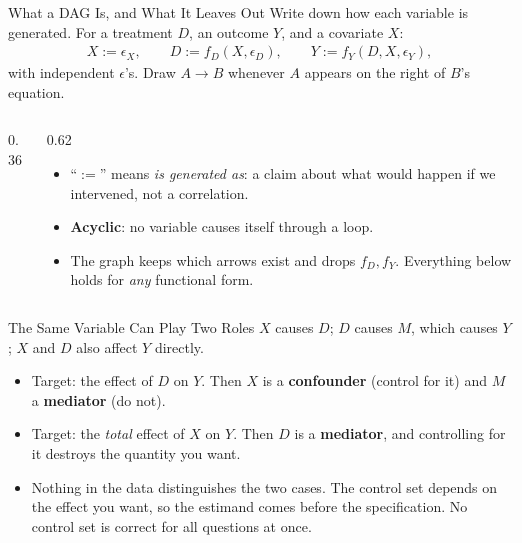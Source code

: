 \documentclass[aspectratio=169,11pt,xcolor=dvipsnames]{beamer}
\begin{document}
\begin{frame}{What a DAG Is, and What It Leaves Out}
Write down how each variable is generated. For a treatment $D$, an outcome
$Y$, and a covariate $X$:
\begin{align*}
  X := \epsilon_X, \qquad
  D := f_D(X, \epsilon_D), \qquad
  Y := f_Y(D, X, \epsilon_Y) ,
\end{align*}
with independent $\epsilon$'s. Draw $A \to B$ whenever $A$ appears on the
right of $B$'s equation.
\begin{columns}[c]
\begin{column}{0.36\textwidth}
\centering
{}
\end{column}
\begin{column}{0.62\textwidth}
\begin{itemize}\itemsep3pt
  \item ``$:=$'' means \emph{is generated as}: a claim about what would
        happen if we intervened, not a correlation.
  \item \textbf{Acyclic}: no variable causes itself through a loop.
  \item The graph keeps which arrows exist and drops $f_D, f_Y$. Everything
        below holds for \emph{any} functional form.
\end{itemize}
\end{column}
\end{columns}
\end{frame}

\begin{frame}{The Same Variable Can Play Two Roles}
$X$ causes $D$; $D$ causes $M$, which causes $Y$; $X$ and $D$ also affect $Y$
directly.
\begin{center}
\end{center}
\begin{itemize}\itemsep3pt
  \item Target: the effect of $D$ on $Y$. Then $X$ is a \textbf{confounder}
        (control for it) and $M$ a \textbf{mediator} (do not).
  \item Target: the \emph{total} effect of $X$ on $Y$. Then $D$ is a
        \textbf{mediator}, and controlling for it destroys the quantity you
        want.
  \item \alert{Nothing in the data distinguishes the two cases.} The control
        set depends on the effect you want, so the estimand comes before the
        specification. No control set is correct for all questions at once.
\end{itemize}
\end{frame}
\end{document}
